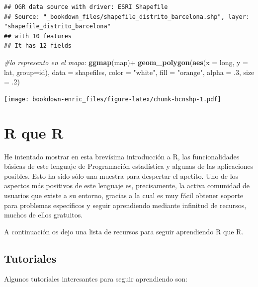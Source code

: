 \documentclass[]{book}
\newenvironment{Shaded}{\begin{snugshade}}{\end{snugshade}}
\newcommand{\KeywordTok}[1]{\textcolor[rgb]{0.13,0.29,0.53}{\textbf{{#1}}}}
\newcommand{\DataTypeTok}[1]{\textcolor[rgb]{0.13,0.29,0.53}{{#1}}}
\newcommand{\DecValTok}[1]{\textcolor[rgb]{0.00,0.00,0.81}{{#1}}}
\newcommand{\StringTok}[1]{\textcolor[rgb]{0.31,0.60,0.02}{{#1}}}
\newcommand{\CommentTok}[1]{\textcolor[rgb]{0.56,0.35,0.01}{\textit{{#1}}}}
\newcommand{\NormalTok}[1]{{#1}}
\theoremstyle{definition}
\theoremstyle{definition}
\theoremstyle{remark}
\begin{document}
\begin{verbatim}
## OGR data source with driver: ESRI Shapefile 
## Source: "_bookdown_files/shapefile_distrito_barcelona.shp", layer: "shapefile_distrito_barcelona"
## with 10 features
## It has 12 fields
\end{verbatim}

\begin{Shaded}
\begin{Highlighting}[]
\CommentTok{#lo represento en el mapa:}
\KeywordTok{ggmap}\NormalTok{(map)+}\StringTok{ }\KeywordTok{geom_polygon}\NormalTok{(}\KeywordTok{aes}\NormalTok{(}\DataTypeTok{x =} \NormalTok{long, }\DataTypeTok{y =} \NormalTok{lat, }\DataTypeTok{group=}\NormalTok{id), }
\DataTypeTok{data =} \NormalTok{shapefiles, }\DataTypeTok{color =} \StringTok{"white"}\NormalTok{, }\DataTypeTok{fill =} \StringTok{"orange"}\NormalTok{, }
\DataTypeTok{alpha =} \NormalTok{.}\DecValTok{3}\NormalTok{, }\DataTypeTok{size =} \NormalTok{.}\DecValTok{2}\NormalTok{)}
\end{Highlighting}
\end{Shaded}

\texttt{[image: bookdown-enric\_files/figure-latex/chunk-bcnshp-1.pdf]}

\chapter{R que R}\label{r-que-r}

He intentado mostrar en esta brevísima introducción a R, las
funcionalidades básicas de este lenguaje de Programación estadística y
algunas de las aplicaciones posibles. Esto ha sido sólo una muestra para
despertar el apetito. Uno de los aspectos más positivos de este lenguaje
es, precisamente, la activa comunidad de usuarios que existe a su
entorno, gracias a la cual es muy fácil obtener soporte para problemas
específicos y seguir aprendiendo mediante infinitud de recursos, muchos
de ellos gratuitos.

A continuación os dejo una lista de recursos para seguir aprendiendo R
que R.

\section{Tutoriales}\label{tutoriales}

Algunos tutoriales interesantes para seguir aprendiendo son:
\end{document}
